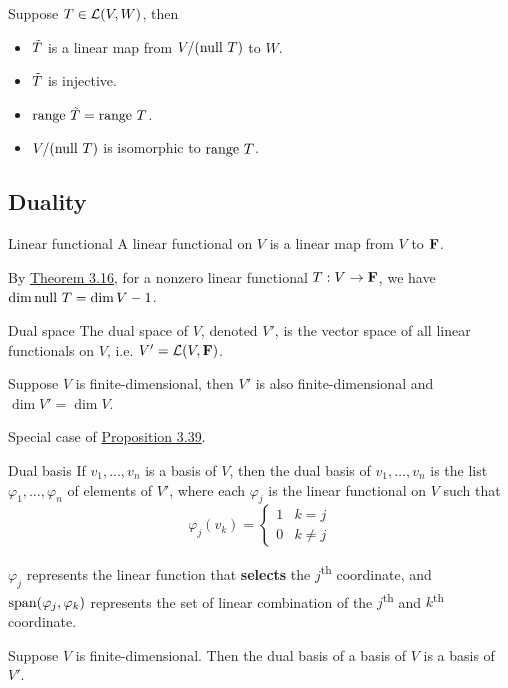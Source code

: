\documentclass[12pt,a4paper]{article}
\begin{document}
    \begin{prop}
        Suppose $T\in\mathcal{L}(V,W)$, then
        \begin{itemize}
            \item $\Tilde{T}$ is a linear map from $V/(\operatorname{null\,} T)$ to $W$.
            \item $\Tilde{T}$ is injective.
            \item $\operatorname{range\,} \Tilde{T}=\operatorname{range\,} T$.
            \item $V/(\operatorname{null\,} T)$ is isomorphic to $\operatorname{range\,} T$.
        \end{itemize}
    \end{prop}
    \hfill

    \subsection{Duality}
    \begin{defi}{Linear functional}\label{3.61}
        A linear functional on $V$ is a linear map from $V$ to $\mathbf{F}$.
    \end{defi}
    \begin{remark}
        By \hyperref[3.16]{Theorem 3.16}, for a nonzero linear functional $T:V\to\mathbf{F}$, we have $\dim\operatorname{null\,} T=\dim V-1$.
    \end{remark}
    \begin{defi}{Dual space}%
        The dual space of $V$, denoted $V'$, is the vector space of all linear functionals on $V$, i.e. $V'=\mathcal{L}(V,\mathbf{F})$.
    \end{defi}
    \hfill

    \begin{prop}
        Suppose $V$ is finite-dimensional, then $V'$ is also finite-dimensional and $\dim V'=\dim V$.
    \end{prop}
    \begin{remark}
        Special case of \hyperref[3.39]{Proposition 3.39}.
    \end{remark}
    \hfill

    \begin{defi}{Dual basis}
        If $v_1,\dots,v_n$ is a basis of $V$, then the dual basis of $v_1,\dots,v_n$ is the list $\varphi_1,\dots,\varphi_n$ of elements of $V'$, where each $\varphi_j$ is the linear functional on $V$ such that
        $$
        \varphi_j(v_k)=\begin{cases}1 & k=j\\0 & k\neq j\end{cases}
        $$
    \end{defi}
    \begin{remark}
        $\varphi_j$ represents the linear function that \textbf{selects} the $j$\textsuperscript{th} coordinate, and $\operatorname{span}(\varphi_j,\varphi_k)$ represents the set of linear combination of the $j$\textsuperscript{th} and $k$\textsuperscript{th} coordinate.
    \end{remark}
    \begin{prop}
        Suppose $V$ is finite-dimensional. Then the dual basis of a basis of $V$ is a basis of $V'$.
    \end{prop}
    \hfill
\end{document}
